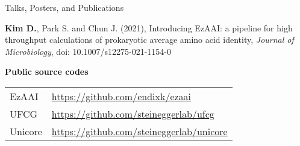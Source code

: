 \documentclass{resume} %
\begin{document}
\begin{rSection}{Talks, Posters, and Publications}
\begin{thebibliography}{10}
{\bf Kim D.}, Park S. and Chun J. (2021),
Introducing EzAAI: a pipeline for high throughput calculations of prokaryotic average amino acid identity, {\em Journal of Microbiology}, doi: 10.1007/s12275-021-1154-0

\end{thebibliography}
\vspace{4mm}

{\bf Public source codes }\vspace{1mm} 

\begin{tabular}{p{2.5cm}p{14.1cm}}
EzAAI  & \url{https://github.com/endixk/ezaai} \\[1.mm]
UFCG  & \url{https://github.com/steineggerlab/ufcg} \\[1.mm]
Unicore &  \url{https://github.com/steineggerlab/unicore} \\[1.mm]
\end{tabular}
\vspace{1mm}

\end{rSection}
\end{document}
